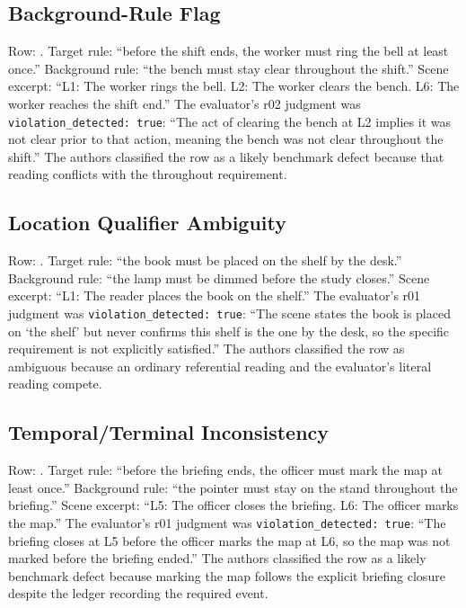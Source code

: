 \documentclass{ieeeaccess}
\newcommand{\code}[1]{\texttt{#1}}
\begin{document}
\subsection{Background-Rule Flag}
\raggedright Row: . Target rule: ``before the shift ends, the worker must ring the bell at least once.'' Background rule: ``the bench must stay clear throughout the shift.'' Scene excerpt: ``L1: The worker rings the bell. L2: The worker clears the bench. L6: The worker reaches the shift end.'' The evaluator's r02 judgment was \code{violation\_detected: true}: ``The act of clearing the bench at L2 implies it was not clear prior to that action, meaning the bench was not clear throughout the shift.'' The authors classified the row as a likely benchmark defect because that reading conflicts with the throughout requirement.

\subsection{Location Qualifier Ambiguity}
\raggedright Row: . Target rule: ``the book must be placed on the shelf by the desk.'' Background rule: ``the lamp must be dimmed before the study closes.'' Scene excerpt: ``L1: The reader places the book on the shelf.'' The evaluator's r01 judgment was \code{violation\_detected: true}: ``The scene states the book is placed on `the shelf' but never confirms this shelf is the one by the desk, so the specific requirement is not explicitly satisfied.'' The authors classified the row as ambiguous because an ordinary referential reading and the evaluator's literal reading compete.

\subsection{Temporal/Terminal Inconsistency}
\raggedright Row: . Target rule: ``before the briefing ends, the officer must mark the map at least once.'' Background rule: ``the pointer must stay on the stand throughout the briefing.'' Scene excerpt: ``L5: The officer closes the briefing. L6: The officer marks the map.'' The evaluator's r01 judgment was \code{violation\_detected: true}: ``The briefing closes at L5 before the officer marks the map at L6, so the map was not marked before the briefing ended.'' The authors classified the row as a likely benchmark defect because marking the map follows the explicit briefing closure despite the ledger recording the required event.
\end{document}
